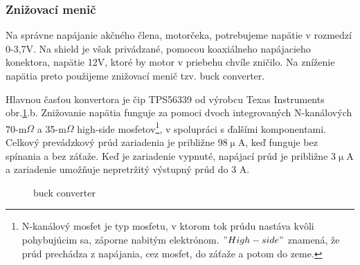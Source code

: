 \subsubsection{Znižovací menič}
\label{nap}

Na správne napájanie akčného člena, motorčeka, potrebujeme napätie v rozmedzí 0-3,7V. Na shield je však privádzané, pomocou koaxiálneho napájacieho konektora, napätie 12V, ktoré by motor v priebehu chvíle zničilo. Na zníženie napätia preto použijeme znižovací menič tzv. buck converter. 

Hlavnou časťou konvertora je čip TPS56339 od výrobcu Texas Instruments obr.\ref{OBRAZOK 2.1}.b. Znižovanie napätia funguje za pomoci dvoch integrovaných N-kanálových 70-m$\Omega$ a 35-m$\Omega$ high-side mosfetov\footnote[4]{N-kanálový mosfet je typ mosfetu, v ktorom tok prúdu nastáva kvôli pohybujúcim sa, záporne nabitým elektrónom. $"High-side"$ znamená, že prúd prechádza z napájania, cez mosfet, do záťaže a potom do zeme.}, v spolupráci s ďalšími komponentami. Celkový prevádzkový prúd zariadenia je približne 98$\upmu$A, keď funguje bez spínania a bez záťaže. Keď je zariadenie vypnuté, napájací prúd je približne 3$\upmu$A a zariadenie umožňuje nepretržitý výstupný prúd do 3 A\cite{buckobr}.

\begin{figure}[!tbh]
	\hfill
	\hfill
	\hfill
	\caption{buck converter}\label{OBRAZOK 2.1}
\end{figure}

